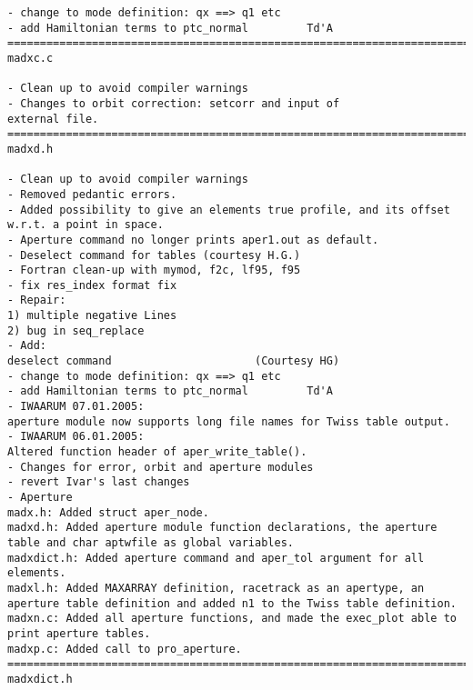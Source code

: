 \begin{verbatim}
- change to mode definition: qx ==> q1 etc
- add Hamiltonian terms to ptc_normal         Td'A
=============================================================================
madxc.c

- Clean up to avoid compiler warnings
- Changes to orbit correction: setcorr and input of
external file.
=============================================================================
madxd.h

- Clean up to avoid compiler warnings
- Removed pedantic errors.
- Added possibility to give an elements true profile, and its offset
w.r.t. a point in space.
- Aperture command no longer prints aper1.out as default.
- Deselect command for tables (courtesy H.G.)
- Fortran clean-up with mymod, f2c, lf95, f95
- fix res_index format fix
- Repair:
1) multiple negative Lines
2) bug in seq_replace
- Add:
deselect command                      (Courtesy HG)
- change to mode definition: qx ==> q1 etc
- add Hamiltonian terms to ptc_normal         Td'A
- IWAARUM 07.01.2005:
aperture module now supports long file names for Twiss table output.
- IWAARUM 06.01.2005:
Altered function header of aper_write_table().
- Changes for error, orbit and aperture modules
- revert Ivar's last changes
- Aperture
madx.h: Added struct aper_node.
madxd.h: Added aperture module function declarations, the aperture
table and char aptwfile as global variables.
madxdict.h: Added aperture command and aper_tol argument for all elements.
madxl.h: Added MAXARRAY definition, racetrack as an apertype, an
aperture table definition and added n1 to the Twiss table definition.
madxn.c: Added all aperture functions, and made the exec_plot able to
print aperture tables.
madxp.c: Added call to pro_aperture.
=============================================================================
madxdict.h


\end{verbatim}
